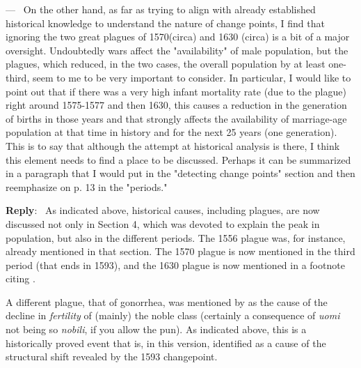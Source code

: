\documentclass[11pt]{article}
\newcounter{reviewer}
\newcounter{point}[reviewer]
\renewcommand{\thepoint}{P\,\thereviewer.\arabic{point}}
\newenvironment{point}
   {\refstepcounter{point} \bigskip \noindent {\textbf{Reviewer~Point~\thepoint} } ---\ }
   {\par }
\newenvironment{reply}
   {\medskip \noindent \begin{sf}\textbf{Reply}:\  }
   {\medskip \end{sf}}
\begin{document}
\begin{point}
  On the other hand, as far as trying to align with already established
  historical knowledge to understand the nature of change points, I find that
  ignoring the two great plagues of 1570(circa) and 1630 (circa) is a bit of a
  major oversight. Undoubtedly wars affect the "availability" of male
  population, but the plagues, which reduced, in the two cases, the overall
  population by at least one-third, seem to me to be very important to
  consider. In particular, I would like to point out that if there was a very
  high infant mortality rate (due to the plague) right around 1575-1577 and then
  1630, this causes a reduction in the generation of births in those years and
  that strongly affects the availability of marriage-age population at that time
  in history and for the next 25 years (one generation). This is to say that
  although the attempt at historical analysis is there, I think this element
  needs to find a place to be discussed. Perhaps it can be summarized in a
  paragraph that I would put in the "detecting change points" section and then
  reemphasize on p. 13 in the "periods."
\end{point}

\begin{reply}
As indicated above, historical causes, including plagues, are now discussed not
only in Section 4, which was devoted to explain the peak in population, but also
in the different periods. The 1556 plague was, for instance, already mentioned
in that section. The 1570 plague is now mentioned in the third period (that ends
in 1593), and the 1630 plague
is now mentioned in a footnote citing \cite{raines2003cooptazione}.

A different plague, that of gonorrhea, was mentioned by \cite{davis1962decline}
as the cause of the decline in {\em fertility} of (mainly) the noble class
(certainly a consequence of {\em uomi} not being so {\em nobili}, if you allow
the pun). As indicated above, this is a historically proved event that is, in
this version, identified as a cause of the structural shift revealed by the 1593
changepoint.
\end{reply}




\end{document}
